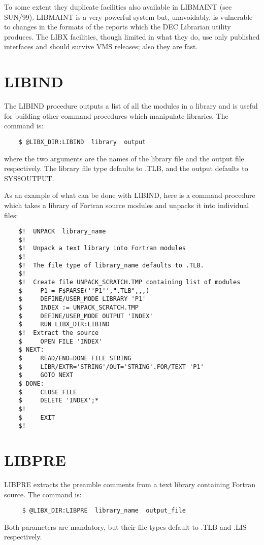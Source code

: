 To some extent they duplicate facilities also available in
LIBMAINT (see SUN/99).  LIBMAINT is a very powerful system
but, unavoidably, is vulnerable to changes in the formats
of the reports which the DEC Librarian utility produces.
The LIBX facilities, though limited in what they
do, use only published interfaces and should survive
VMS releases;  also they are fast.

\section{LIBIND}

The LIBIND procedure
outputs a list of all the modules in a library and is
useful for building other command procedures which manipulate
libraries.  The command is:
\begin{verbatim}
    $ @LIBX_DIR:LIBIND  library  output
\end{verbatim}
where the two arguments are the names of the library file and the
output file respectively.
The library file type defaults to .TLB,
and the output defaults to SYS\$OUTPUT.

As an example of what can be done with LIBIND, here is a command
procedure which takes a library of Fortran source modules and
unpacks it into individual files:
\begin{verbatim}
    $!  UNPACK  library_name
    $!
    $!  Unpack a text library into Fortran modules
    $!
    $!  The file type of library_name defaults to .TLB.
    $!  
    $!  Create file UNPACK_SCRATCH.TMP containing list of modules
    $     P1 = F$PARSE(''P1'',".TLB",,,)
    $     DEFINE/USER_MODE LIBRARY 'P1'
    $     INDEX := UNPACK_SCRATCH.TMP
    $     DEFINE/USER_MODE OUTPUT 'INDEX'
    $     RUN LIBX_DIR:LIBIND
    $!  Extract the source
    $     OPEN FILE 'INDEX'
    $ NEXT:
    $     READ/END=DONE FILE STRING
    $     LIBR/EXTR='STRING'/OUT='STRING'.FOR/TEXT 'P1'
    $     GOTO NEXT
    $ DONE:
    $     CLOSE FILE
    $     DELETE 'INDEX';*
    $!
    $     EXIT
    $!
\end{verbatim}

\section{LIBPRE}

LIBPRE extracts the preamble comments from a text library containing
Fortran source.  The command is:
\begin{verbatim}
     $ @LIBX_DIR:LIBPRE  library_name  output_file
\end{verbatim}
Both parameters are mandatory, but their file types
default to .TLB and .LIS respectively.

